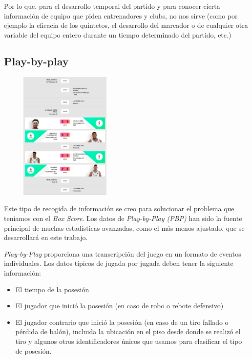 \documentclass[paper=a4, fontsize=9pt]{article}
\begin{document}
Por lo que, para el desarrollo temporal del partido y para conocer cierta información de equipo que piden entrenadores y clubs, no nos sirve (como por ejemplo la eficacia de los quintetos, el desarrollo del marcador o de cualquier otra variable del equipo entero durante un tiempo determinado del partido, etc.)



\subsection{Play-by-play}

\begin{figure}
    \centering
    \includegraphics[width=0.4\textwidth]{imagenes/PBP_RM.png}
    \captionsetup{width=.9\linewidth}
    \label{fig:PBP_RM}
\end{figure}

Este tipo de recogida de información se creo para solucionar el problema que teniamos con el \emph{Box Score}. Los datos de \emph{Play-by-Play (PBP)} han sido la fuente principal de muchas estadísticas avanzadas, como el más-menos ajustado, que se desarrollará en este trabajo.

\emph{Play-by-Play} proporciona una transcripción del juego en un formato de eventos individuales. Los datos típicos de jugada por jugada deben tener la siguiente información:
  
  \begin{itemize}
\item El tiempo de la posesión
\item El jugador que inició la posesión (en caso de robo o rebote defensivo)
\item El jugador contrario que inició la posesión (en caso de un tiro fallado o pérdida de balón), incluida la ubicación en el piso desde donde se realizó el tiro y algunos otros identificadores únicos que usamos para clasificar el tipo de posesión.
\end{itemize}
\end{document}
